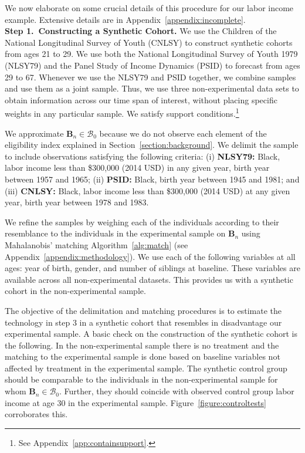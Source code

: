 We now elaborate on some crucial details of this procedure for our labor income example. Extensive details are in Appendix~\ref{appendix:incomplete}.\\

\noindent \textbf{Step 1.\ Constructing a Synthetic Cohort.} We use the Children of the National Longitudinal Survey of Youth (CNLSY) to construct synthetic cohorts from ages 21 to 29. We use both the National Longitudinal Survey of Youth 1979 (NLSY79) and the Panel Study of Income Dynamics (PSID) to forecast from ages 29 to 67. Whenever we use the NLSY79 and PSID together, we combine samples and use them as a joint sample. Thus, we use three non-experimental data sets to obtain information across our time span of interest, without placing specific weights in any particular sample. We satisfy support conditions.\footnote{See Appendix~\ref{app:containsupport}.}

We approximate $\bm{B}_{n} \in \mathcal{B}_0$ because we do not observe each element of the eligibility index explained in Section~\ref{section:background}. We delimit the sample to include observations satisfying the following criteria: (i) \textbf{NLSY79:} Black, labor income less than \$300,000 (2014 USD) in any given year, birth year between 1957 and 1965; (ii) \textbf{PSID:} Black, birth year between 1945 and 1981; and (iii) \textbf{CNLSY:} Black, labor income less than \$300,000 (2014 USD) at any given year, birth year between 1978 and 1983.

We refine the samples by weighing each of the individuals according to their resemblance to the individuals in the experimental sample on $\bm{B}_{n}$ using Mahalanobis' matching Algorithm~\ref{alg:match} (see Appendix~\ref{appendix:methodology}). We use each of the following variables at all ages: year of birth, gender, and number of siblings at baseline. These variables are available across all non-experimental datasets. This provides us with a synthetic cohort in the non-experimental sample.

The objective of the delimitation and matching procedures is to estimate the technology in step 3 in a synthetic cohort that resembles in disadvantage our experimental sample. A basic check on the construction of the synthetic cohort is the following. In the non-experimental sample there is no treatment and the matching to the experimental sample is done based on baseline variables not affected by treatment in the experimental sample. The synthetic control group should be comparable to the individuals in the non-experimental sample for whom $\bm{B}_{n} \in \mathcal{B}_0$. Further, they should coincide with observed control group labor income at age 30 in the experimental sample. Figure~\ref{figure:controltests} corroborates this.\\

